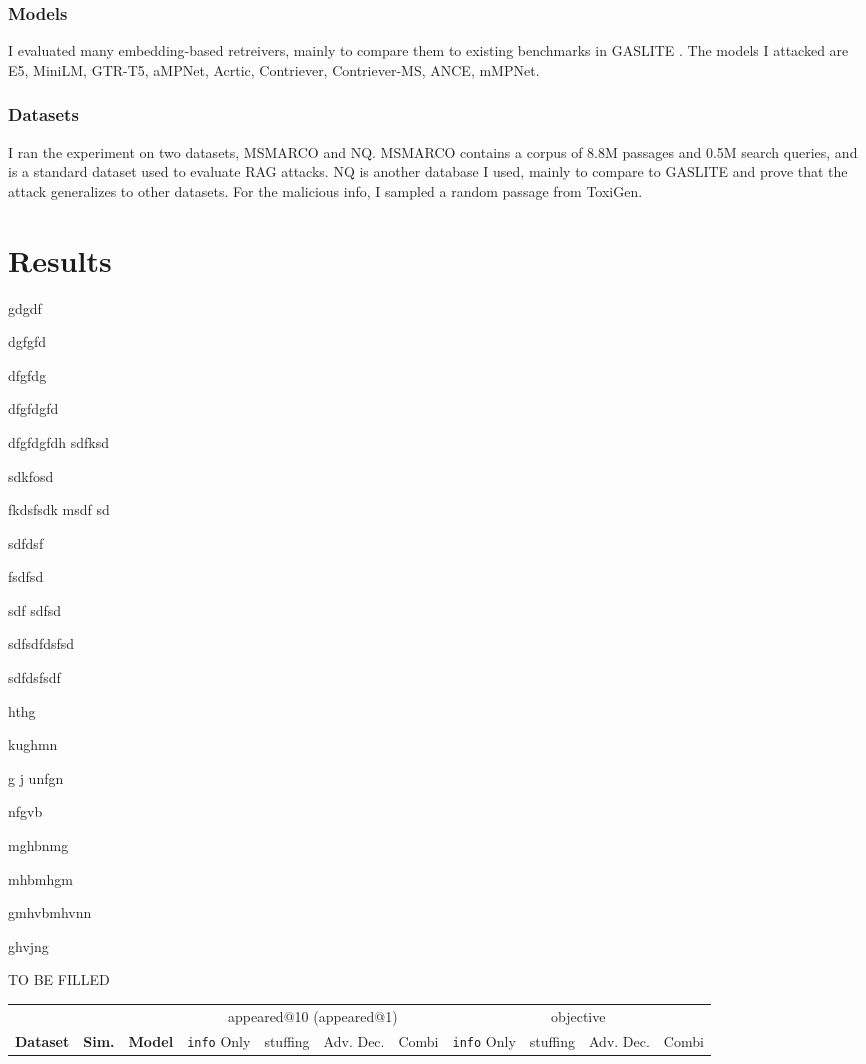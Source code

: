 \documentclass[a4paper, sigconf]{acmart}
\begin{document}
\subsubsection*{Models} I evaluated many embedding-based retreivers, mainly to compare them to existing benchmarks in GASLITE \cite{bentov2024}. The models I attacked are E5, MiniLM, GTR-T5, aMPNet, Acrtic, Contriever, Contriever-MS, ANCE, mMPNet. %

\subsubsection*{Datasets} I ran the experiment on two datasets, MSMARCO and NQ. MSMARCO contains a corpus of 8.8M passages and 0.5M search queries, and is a standard dataset used to evaluate RAG attacks. NQ is another database I used, mainly to compare to GASLITE \cite{bentov2024} and prove that the attack generalizes to other datasets. For the malicious info, I sampled a random passage from ToxiGen.


\section{Results}

gdgdf

dgfgfd

dfgfdg


dfgfdgfd

dfgfdgfdh
sdfksd


sdkfosd\

fkdsfsdk
msdf
sd

sdfdsf


fsdfsd

sdf
sdfsd



sdfsdfdsfsd

sdfdsfsdf


hthg


kughmn


g
j
unfgn

nfgvb

mghbnmg

mhbmhgm

gmhvbmhvnn

ghvjng



TO BE FILLED

  
  
  
\begin{table*}
\begin{tabular}{lll|cccc|cccc}
  \hline
   & & & \multicolumn{4}{c}{appeared@10 (appeared@1)} & \multicolumn{4}{c}{objective} \\
  \textbf{Dataset} & \textbf{Sim.} & \textbf{Model} & \texttt{info} Only & stuffing & Adv. Dec. & Combi & \texttt{info} Only & stuffing & Adv. Dec. & Combi \\
  \hline
 
 \end{tabular}
\end{table*}
\end{document}
